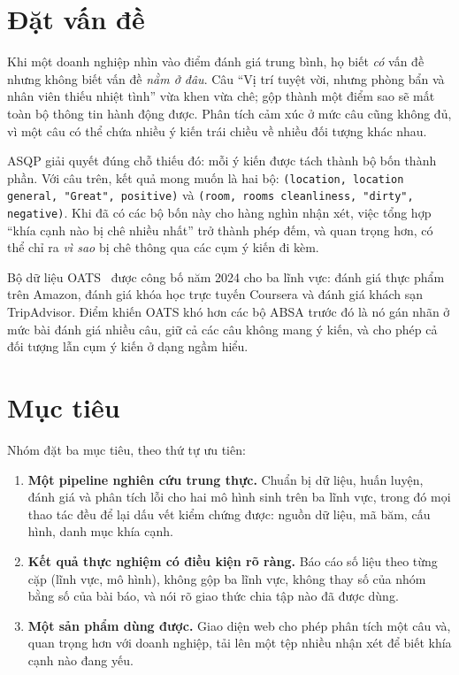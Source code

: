 \documentclass[12pt,a4paper]{report}
\newcommand{\enquote}[1]{“#1”}
\newcommand{\code}[1]{\texttt{#1}}
\begin{document}
\section{Đặt vấn đề}

Khi một doanh nghiệp nhìn vào điểm đánh giá trung bình, họ biết \emph{có} vấn đề nhưng không biết vấn đề \emph{nằm ở đâu}.
Câu \enquote{Vị trí tuyệt vời, nhưng phòng bẩn và nhân viên thiếu nhiệt tình} vừa khen vừa chê; gộp thành một điểm sao sẽ
mất toàn bộ thông tin hành động được. Phân tích cảm xúc ở mức câu cũng không đủ, vì một câu có thể chứa nhiều ý kiến trái
chiều về nhiều đối tượng khác nhau.

ASQP giải quyết đúng chỗ thiếu đó: mỗi ý kiến được tách thành bộ bốn thành phần. Với câu trên, kết quả mong muốn là hai
bộ: \code{(location, location general, "Great", positive)} và \code{(room, rooms cleanliness, "dirty", negative)}.
Khi đã có các bộ bốn này cho hàng nghìn nhận xét, việc tổng hợp \enquote{khía cạnh nào bị chê nhiều nhất} trở thành phép
đếm, và quan trọng hơn, có thể chỉ ra \emph{vì sao} bị chê thông qua các cụm ý kiến đi kèm.

Bộ dữ liệu OATS~\cite{oats2024} được công bố năm 2024 cho ba lĩnh vực: đánh giá thực phẩm trên Amazon, đánh giá khóa học
trực tuyến Coursera và đánh giá khách sạn TripAdvisor. Điểm khiến OATS khó hơn các bộ ABSA trước đó là nó gán nhãn ở mức
bài đánh giá nhiều câu, giữ cả các câu không mang ý kiến, và cho phép cả đối tượng lẫn cụm ý kiến ở dạng ngầm hiểu.

\section{Mục tiêu}

Nhóm đặt ba mục tiêu, theo thứ tự ưu tiên:

\begin{enumerate}
  \item \textbf{Một pipeline nghiên cứu trung thực.} Chuẩn bị dữ liệu, huấn luyện, đánh giá và phân tích lỗi cho hai mô
        hình sinh trên ba lĩnh vực, trong đó mọi thao tác đều để lại dấu vết kiểm chứng được: nguồn dữ liệu, mã băm, cấu
        hình, danh mục khía cạnh.
  \item \textbf{Kết quả thực nghiệm có điều kiện rõ ràng.} Báo cáo số liệu theo từng cặp (lĩnh vực, mô hình), không gộp
        ba lĩnh vực, không thay số của nhóm bằng số của bài báo, và nói rõ giao thức chia tập nào đã được dùng.
  \item \textbf{Một sản phẩm dùng được.} Giao diện web cho phép phân tích một câu và, quan trọng hơn với doanh nghiệp,
        tải lên một tệp nhiều nhận xét để biết khía cạnh nào đang yếu.
\end{enumerate}
\end{document}
